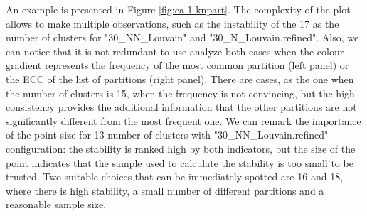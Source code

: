An example is presented in Figure \ref{fig:ca-1-knpart}. The complexity of the plot allows to make multiple observations, such as the instability of the 17 as the number of clusters for "30\_NN\_Louvain" and "30\_N\_Louvain.refined". Also, we can notice that it is not redundant to use analyze both cases when the colour gradient represents the frequency of the most common partition (left panel) or the ECC of the list of partitions (right panel). There are cases, as the one when the number of clusters is 15, when the frequency is not convincing, but the high consistency provides the additional information that the other partitions are not significantly different from the most frequent one. We can remark the importance of the point size for 13 number of clusters with "30\_NN\_Louvain.refined" configuration: the stability is ranked high by both indicators, but the size of the point indicates that the sample used to calculate the stability is too small to be trusted. Two suitable choices that can be immediately spotted are 16 and 18, where there is high stability, a small number of different partitions and a reasonable sample size.

